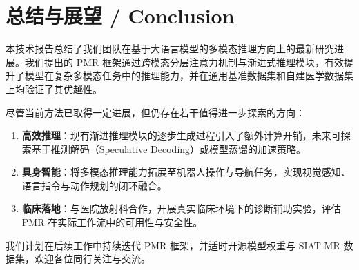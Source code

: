 \section{总结与展望 / Conclusion}\label{sec:conclusion}

本技术报告总结了我们团队在基于大语言模型的多模态推理方向上的最新研究进展。我们提出的 PMR 框架通过跨模态分层注意力机制与渐进式推理模块，有效提升了模型在复杂多模态任务中的推理能力，并在通用基准数据集和自建医学数据集上均验证了其优越性。

尽管当前方法已取得一定进展，但仍存在若干值得进一步探索的方向：
\begin{enumerate}
  \item \textbf{高效推理}：现有渐进推理模块的逐步生成过程引入了额外计算开销，未来可探索基于推测解码（Speculative Decoding）或模型蒸馏的加速策略。
  \item \textbf{具身智能}：将多模态推理能力拓展至机器人操作与导航任务，实现视觉感知、语言指令与动作规划的闭环融合。
  \item \textbf{临床落地}：与医院放射科合作，开展真实临床环境下的诊断辅助实验，评估 PMR 在实际工作流中的可用性与安全性。
\end{enumerate}

我们计划在后续工作中持续迭代 PMR 框架，并适时开源模型权重与 SIAT-MR 数据集，欢迎各位同行关注与交流。
